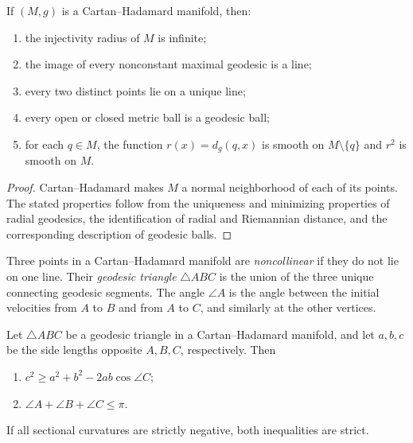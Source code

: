 \begin{proposition}
\label{prop:basic-properties-cartan-hadamard}
If $(M,g)$ is a Cartan--Hadamard manifold, then:
\begin{enumerate}[label=(\alph*)]
\item the injectivity radius of $M$ is infinite;
\item the image of every nonconstant maximal geodesic is a line;
\item every two distinct points lie on a unique line;
\item every open or closed metric ball is a geodesic ball;
\item for each $q\in M$, the function $r(x)=d_g(q,x)$ is smooth on
$M\setminus\{q\}$ and $r^2$ is smooth on $M$.
\end{enumerate}
\begin{proof}
\sketch Cartan--Hadamard makes $M$ a normal neighborhood of each of its
points.  The stated properties follow from the uniqueness and minimizing
properties of radial geodesics, the identification of radial and Riemannian
distance, and the corresponding description of geodesic balls.
\end{proof}
\end{proposition}

Three points in a Cartan--Hadamard manifold are \emph{noncollinear} if they do
not lie on one line.  Their \emph{geodesic triangle} $\triangle ABC$ is the
union of the three unique connecting geodesic segments.  The angle $\angle A$
is the angle between the initial velocities from $A$ to $B$ and from $A$ to
$C$, and similarly at the other vertices.

\begin{proposition}
\label{prop:geodesic-triangle-inequalities}
Let $\triangle ABC$ be a geodesic triangle in a Cartan--Hadamard manifold,
and let $a,b,c$ be the side lengths opposite $A,B,C$, respectively.  Then
\begin{enumerate}
\item[(a)] $c^2\geq a^2+b^2-2ab\cos\angle C$;
\item[(b)] $\angle A+\angle B+\angle C\leq\pi$.
\end{enumerate}
If all sectional curvatures are strictly negative, both inequalities are
strict.
\end{proposition}

